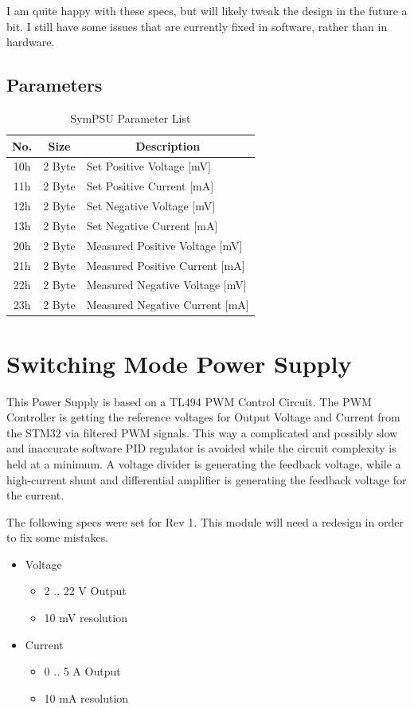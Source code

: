 I am quite happy with these specs, but will likely tweak the design in the future a bit. I still have some issues that are currently fixed in software, rather than in hardware. 

\subsection{Parameters}
\begin{table}[H]
    \centering
    \begin{tabular}{|c|c|l|}
        \hline
        \textbf{No.}   &   \textbf{Size} & \multicolumn{1}{|c|}{\textbf{Description}}\\ \hline \hline
        10h   &  2 Byte &  Set Positive Voltage [mV]\\ \hline
		11h   &  2 Byte &  Set Positive Current [mA]\\ \hline
		12h   &  2 Byte &  Set Negative Voltage [mV]\\ \hline
		13h   &  2 Byte &  Set Negative Current [mA]\\ \hline
		20h   &  2 Byte &  Measured Positive Voltage [mV]\\ \hline
		21h   &  2 Byte &  Measured Positive Current [mA]\\ \hline
		22h   &  2 Byte &  Measured Negative Voltage [mV]\\ \hline
		23h   &  2 Byte &  Measured Negative Current [mA]\\ \hline
    \end{tabular}
	\caption{SymPSU Parameter List}
\label{tab:Par-SymPSU}
\end{table}

\section{Switching Mode Power Supply}
This Power Supply is based on a TL494 PWM Control Circuit. The PWM Controller is getting the reference voltages for Output Voltage and Current from the STM32 via filtered PWM signals. This way a complicated and possibly slow and inaccurate software PID regulator is avoided while the circuit complexity is held at a minimum. A voltage divider is generating the feedback voltage, while a high-current shunt and differential amplifier is generating the feedback voltage for the current. 

The following specs were set for Rev 1. This module will need a redesign in order to fix some mistakes.

\begin{itemize}
	\item Voltage
	\begin{itemize}
		\item 2 .. 22 V Output
		\item 10 mV resolution
	\end{itemize}
	\item Current
	\begin{itemize}
		\item 0 .. 5 A Output
		\item 10 mA resolution
	\end{itemize}
\end{itemize}

